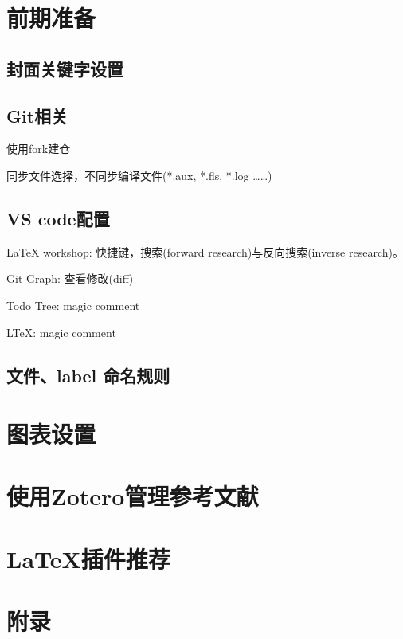 \documentclass[engineeringmaster]{hquThesis}
\begin{document}
\makecover
% 
% 

\frontmatter{
    
    \tableofcontents
}

\mainmatter
\chapter{前期准备}
\section{封面关键字设置}
\section{Git相关}
使用fork建仓

同步文件选择，不同步编译文件(*.aux, *.fls, *.log ……)

\section{VS code配置}
LaTeX workshop: 快捷键，搜索(forward research)与反向搜索(inverse research)。

Git Graph: 查看修改(diff)

Todo Tree: magic comment

LTeX: magic comment

\section{文件、label 命名规则}
\chapter{图表设置}
\chapter{使用Zotero管理参考文献}
\chapter{\LaTeX 插件推荐}



\appendix

\chapter{附录}




\backmatter


\end{document}
